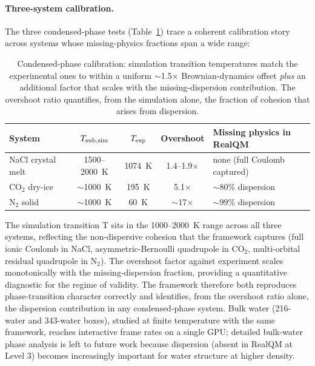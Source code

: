 \documentclass[11pt]{article}
\begin{document}
\paragraph{Three-system calibration.}
The three condensed-phase tests (Table~\ref{tab:condensed}) trace a coherent calibration story across systems whose missing-physics fractions span a wide range:

\begin{table}[h!]
\centering
\small
\begin{tabular}{l c c c l}
\toprule
\textbf{System} & $T_{\rm sub,sim}$ & $T_{\rm exp}$ & \textbf{Overshoot} & \textbf{Missing physics in RealQM} \\
\midrule
NaCl crystal melt    & 1500--2000~K & 1074~K & 1.4--1.9$\times$ & none (full Coulomb captured) \\
CO$_2$ dry-ice       & $\sim$1000~K & 195~K  & 5.1$\times$       & $\sim$80\% dispersion \\
N$_2$ solid          & $\sim$1000~K & 60~K   & $\sim$17$\times$  & $\sim$99\% dispersion \\
\bottomrule
\end{tabular}
\caption{Condensed-phase calibration: simulation transition temperatures match the experimental ones to within a uniform $\sim$1.5$\times$ Brownian-dynamics offset \emph{plus} an additional factor that scales with the missing-dispersion contribution. The overshoot ratio quantifies, from the simulation alone, the fraction of cohesion that arises from dispersion.}
\label{tab:condensed}
\end{table}

The simulation transition T sits in the 1000--2000~K range across all three systems, reflecting the non-dispersive cohesion that the framework captures (full ionic Coulomb in NaCl, asymmetric-Bernoulli quadrupole in CO$_2$, multi-orbital residual quadrupole in N$_2$). The overshoot factor against experiment scales monotonically with the missing-dispersion fraction, providing a quantitative diagnostic for the regime of validity. The framework therefore both reproduces phase-transition character correctly and identifies, from the overshoot ratio alone, the dispersion contribution in any condensed-phase system. Bulk water (216-water and 343-water boxes), studied at finite temperature with the same framework, reaches interactive frame rates on a single GPU; detailed bulk-water phase analysis is left to future work because dispersion (absent in RealQM at Level 3) becomes increasingly important for water structure at higher density.
\end{document}
